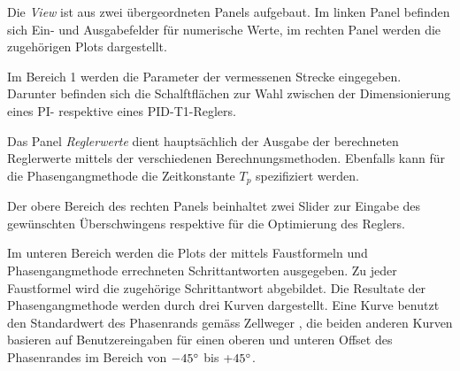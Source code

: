 Die  \emph{View} ist  aus  zwei \"ubergeordneten  Panels aufgebaut. Im  linken
Panel befinden sich Ein- und  Ausgabefelder f\"ur numerische Werte, im rechten
Panel werden die zugeh\"origen Plots dargestellt.



Im  Bereich 1    werden die  Parameter der  vermessenen
Strecke  eingegeben. Darunter  befinden  sich die  Schalftfl\"achen  zur  Wahl
  zwischen der  Dimensionierung eines
PI- respektive eines PID-T1-Reglers.

Das Panel \emph{Reglerwerte} dient haupts\"achlich der Ausgabe der berechneten
Reglerwerte  mittels  der  verschiedenen  Berechnungsmethoden. Ebenfalls  kann
f\"ur  die Phasengangmethode  die Zeitkonstante  $T_p$  spezifiziert werden.  

Der obere  Bereich des rechten Panels  beinhaltet zwei Slider zur  Eingabe des
gew\"unschten \"Uberschwingens respektive f\"ur die Optimierung des Reglers.

Im   unteren    Bereich   werden   die   Plots    der   mittels   Faustformeln
und  Phasengangmethode   errechneten  Schrittantworten   ausgegeben. Zu  jeder
Faustformel wird die zugeh\"orige Schrittantwort abgebildet. Die Resultate der
Phasengangmethode  werden durch  drei Kurven  dargestellt. Eine Kurve  benutzt
den  Standardwert des  Phasenrands gem\"ass  Zellweger , die beiden anderen Kurven basieren auf Benutzereingaben f\"ur einen
oberen und  unteren Offset  des Phasenrandes im  Bereich von  $-45\degree$ bis
$+45\degree$.
